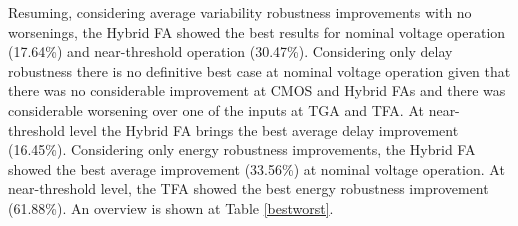\documentclass[ecp,tc, english]{iiufrgs}
\begin{document}
Resuming, considering average variability robustness improvements with no worsenings, the Hybrid FA showed the best results for nominal voltage operation (17.64\%) and near-threshold operation (30.47\%). Considering only delay robustness there is no definitive best case at nominal voltage operation given that there was no considerable improvement at CMOS and Hybrid FAs and there was considerable worsening over one of the inputs at TGA and TFA. At near-threshold level the Hybrid FA brings the best average delay improvement (16.45\%). Considering only energy robustness improvements, the Hybrid FA showed the best average improvement (33.56\%) at nominal voltage operation. At near-threshold level, the TFA showed the best energy robustness improvement (61.88\%). An overview is shown at Table \ref{bestworst}.

\begin{table}[H]
\centering
\caption{General most and less sensible Full Adder over variability}
\label{bestworst}
\end{table}
\end{document}
